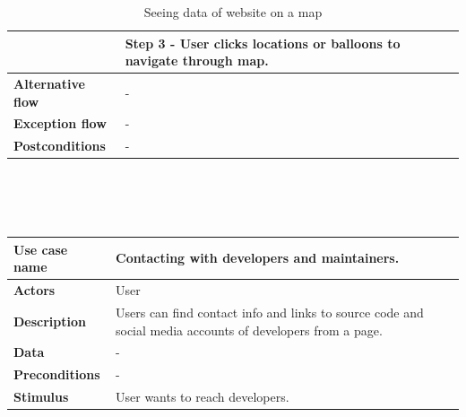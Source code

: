 \begin{center}
\begin{table}[H]
\begin{tabular}{| m{3cm}| m{10cm} |}
                                      & Step 3 - User clicks locations or balloons to navigate through map.                                                                        \\
            \hline
            \textbf{Alternative flow} & -                                                                                                                                          \\
            \hline
            \textbf{Exception flow}   & -                                                                                                                                          \\
            \hline
            \textbf{Postconditions}   & -                                                                                                                                          \\
            \hline
        \end{tabular}
        \caption[Seeing data of website on a map]{Seeing data of website on a map}
    \end{table}
    ~\\~\\~\\
    \begin{table}[H]
        \begin{tabular}{| m{3cm}| m{10cm} |}
            \hline
            \textbf{Use case name}    & Contacting with developers and maintainers.                                                               \\
            \hline
            \textbf{Actors}           & User                                                                                                      \\
            \hline
            \textbf{Description}      & Users can find contact info and links to source code and social media accounts of developers from a page. \\
            \hline
            \textbf{Data}             & -                                                                                                         \\
            \hline
            \textbf{Preconditions}    & -                                                                                                         \\
            \hline
            \textbf{Stimulus}         & User wants to reach developers.                                                                           \\

\end{tabular}
\end{table}
\end{center}
